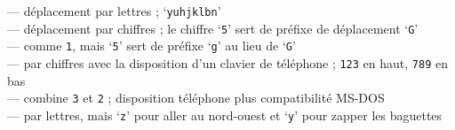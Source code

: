 \documentclass[titlepage]{article}
\begin{document}
\begin{description}[font=\mdseries\itshape]
\newlength{\mwidth}
\newcommand{\numbox}[1]{\makebox[\mwidth][r]{\texttt{#1}}}
\numbox{0} --- déplacement par lettres ; `\texttt{yuhjklbn}'\\
\numbox{1} --- déplacement par chiffres ; le chiffre `\texttt{5}' sert de préfixe de déplacement `\texttt{G}'\\
\numbox{2} --- comme \texttt{1}, mais `\texttt{5}' sert de préfixe `\texttt{g}' au lieu de `\texttt{G}'\\
\numbox{3} --- par chiffres avec la disposition d'un clavier de téléphone ; \texttt{123} en haut, \texttt{789} en bas\\
\numbox{4} --- combine \texttt{3} et \texttt{2} ; disposition téléphone plus compatibilité MS-DOS\\
\numbox{-1} --- par lettres, mais `\texttt{z}' pour aller au nord-ouest et `\texttt{y}' pour zapper les baguettes


\end{description}
\end{document}
